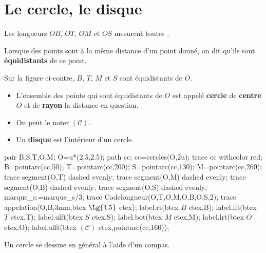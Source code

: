 \section{Le cercle, le disque}
\begin{minipage}{0.7\linewidth}
    Les longueurs $OB$, $OT$, $OM$ et $OS$ mesurent toutes .
    
    \begin{definition}
        Lorsque des points sont à la même distance d'un point donné, on dit qu'ils sont {\bfseries équidistants} de ce point.
    \end{definition}

    \begin{remarque}
        Sur la figure ci-contre, $B$, $T$, $M$ et $S$ sont équidistants de $O$.
    \end{remarque}

    \begin{definition}
        \begin{itemize}
            \item L'ensemble des points qui sont équidistants de $O$ est appelé {\red\bfseries cercle} de {\bfseries centre} $O$ et de {\bfseries rayon} la distance en question.
            \item On peut le noter $(\mathscr C)$.
            \item Un {\bfseries disque} est l'intérieur d'un cercle.
        \end{itemize}
    \end{definition}
\end{minipage}
\begin{minipage}{0.3\linewidth}
    \begin{Geometrie}[CoinHD={(5u,5u)}]
        pair B,S,T,O,M;
        O=u*(2.5,2.5);
        path cc;
        cc=cercles(O,2u);
        trace cc withcolor red;
        B=pointarc(cc,50);
        T=pointarc(cc,200);
        S=pointarc(cc,130);
        M=pointarc(cc,260);
        trace segment(O,T) dashed evenly;
        trace segment(O,M) dashed evenly;
        trace segment(O,B) dashed evenly;
        trace segment(O,S) dashed evenly;
        marque_s:=marque_s/3;
        trace Codelongueur(O,T,O,M,O,B,O,S,2);
        trace appelation(O,B,3mm,btex $\Lg{4.5}$ etex);
        label.rt(btex $B$ etex,B);
        label.lft(btex $T$ etex,T);
        label.ulft(btex $S$ etex,S);
        label.bot(btex $M$ etex,M);
        label.lrt(btex $O$ etex,O);
        label.ulft(btex $(\mathscr C)$ etex,pointarc(cc,160));
    \end{Geometrie} 
\end{minipage}
\begin{remarque}
    Un cercle se dessine en général à l'aide d'un compas.
\end{remarque}


